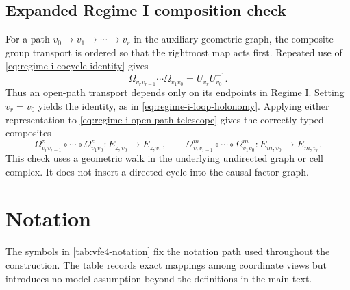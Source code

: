 \section{Expanded Regime I composition check}

For a path $v_0\to v_1\to\cdots\to v_r$ in the auxiliary geometric graph, the composite group transport is ordered so that the rightmost map acts first.  Repeated use of \cref{eq:regime-i-cocycle-identity} gives
\begin{equation}
\Omega_{v_rv_{r-1}}\cdots\Omega_{v_1v_0}
=U_{v_r}U_{v_0}^{-1}.
\label{eq:regime-i-open-path-telescope}
\end{equation}
Thus an open-path transport depends only on its endpoints in Regime I.  Setting $v_r=v_0$ yields the identity, as in \cref{eq:regime-i-loop-holonomy}.  Applying either representation to \cref{eq:regime-i-open-path-telescope} gives the correctly typed composites
\begin{equation}
\Omega^z_{v_rv_{r-1}}\circ\cdots\circ\Omega^z_{v_1v_0}
:E_{z,v_0}\longrightarrow E_{z,v_r},
\qquad
\Omega^m_{v_rv_{r-1}}\circ\cdots\circ\Omega^m_{v_1v_0}
:E_{m,v_0}\longrightarrow E_{m,v_r}.
\label{eq:associated-open-path-types}
\end{equation}
This check uses a geometric walk in the underlying undirected graph or cell complex.  It does not insert a directed cycle into the causal factor graph.

\chapter{Notation}

The symbols in \cref{tab:vfe4-notation} fix the notation path used throughout the construction. The table records exact mappings among coordinate views but introduces no model assumption beyond the definitions in the main text.


